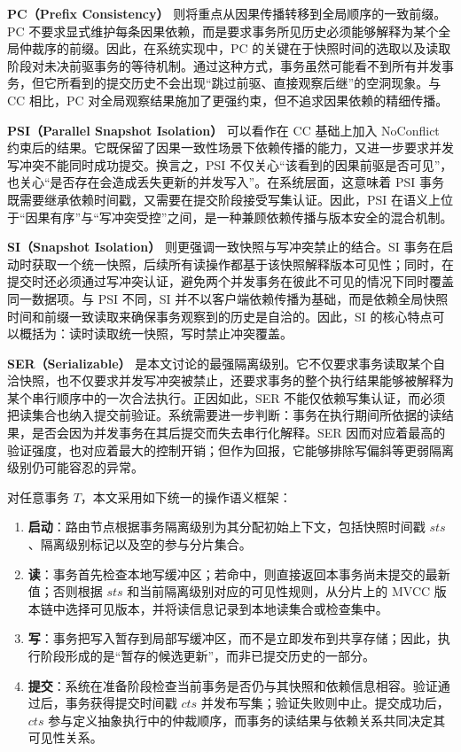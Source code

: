 \textbf{PC（Prefix Consistency）} 则将重点从因果传播转移到全局顺序的一致前缀。PC 不要求显式维护每条因果依赖，而是要求事务所见历史必须能够解释为某个全局仲裁序的前缀。因此，在系统实现中，PC 的关键在于快照时间的选取以及读取阶段对未决前驱事务的等待机制。通过这种方式，事务虽然可能看不到所有并发事务，但它所看到的提交历史不会出现“跳过前驱、直接观察后继”的空洞现象。与 CC 相比，PC 对全局观察结果施加了更强约束，但不追求因果依赖的精细传播。

\textbf{PSI（Parallel Snapshot Isolation）} 可以看作在 CC 基础上加入 NoConflict 约束后的结果。它既保留了因果一致性场景下依赖传播的能力，又进一步要求并发写冲突不能同时成功提交。换言之，PSI 不仅关心“该看到的因果前驱是否可见”，也关心“是否存在会造成丢失更新的并发写入”。在系统层面，这意味着 PSI 事务既需要继承依赖时间戳，又需要在提交阶段接受写集认证。因此，PSI 在语义上位于“因果有序”与“写冲突受控”之间，是一种兼顾依赖传播与版本安全的混合机制。

\textbf{SI（Snapshot Isolation）} 则更强调一致快照与写冲突禁止的结合。SI 事务在启动时获取一个统一快照，后续所有读操作都基于该快照解释版本可见性；同时，在提交时还必须通过写冲突认证，避免两个并发事务在彼此不可见的情况下同时覆盖同一数据项。与 PSI 不同，SI 并不以客户端依赖传播为基础，而是依赖全局快照时间和前缀一致读取来确保事务观察到的历史是自洽的。因此，SI 的核心特点可以概括为：读时读取统一快照，写时禁止冲突覆盖。

\textbf{SER（Serializable）} 是本文讨论的最强隔离级别。它不仅要求事务读取某个自洽快照，也不仅要求并发写冲突被禁止，还要求事务的整个执行结果能够被解释为某个串行顺序中的一次合法执行。正因如此，SER 不能仅依赖写集认证，而必须把读集合也纳入提交前验证。系统需要进一步判断：事务在执行期间所依据的读结果，是否会因为并发事务在其后提交而失去串行化解释。SER 因而对应着最高的验证强度，也对应着最大的控制开销；但作为回报，它能够排除写偏斜等更弱隔离级别仍可能容忍的异常。

对任意事务 $T$，本文采用如下统一的操作语义框架：
\begin{enumerate}
  \item \textbf{启动}：路由节点根据事务隔离级别为其分配初始上下文，包括快照时间戳 $sts$、隔离级别标记以及空的参与分片集合。
  \item \textbf{读}：事务首先检查本地写缓冲区；若命中，则直接返回本事务尚未提交的最新值；否则根据 $sts$ 和当前隔离级别对应的可见性规则，从分片上的 MVCC 版本链中选择可见版本，并将读信息记录到本地读集合或检查集中。
  \item \textbf{写}：事务把写入暂存到局部写缓冲区，而不是立即发布到共享存储；因此，执行阶段形成的是“暂存的候选更新”，而非已提交历史的一部分。
  \item \textbf{提交}：系统在准备阶段检查当前事务是否仍与其快照和依赖信息相容。验证通过后，事务获得提交时间戳 $cts$ 并发布写集；验证失败则中止。提交成功后，$cts$ 参与定义抽象执行中的仲裁顺序，而事务的读结果与依赖关系共同决定其可见性关系。
\end{enumerate}

